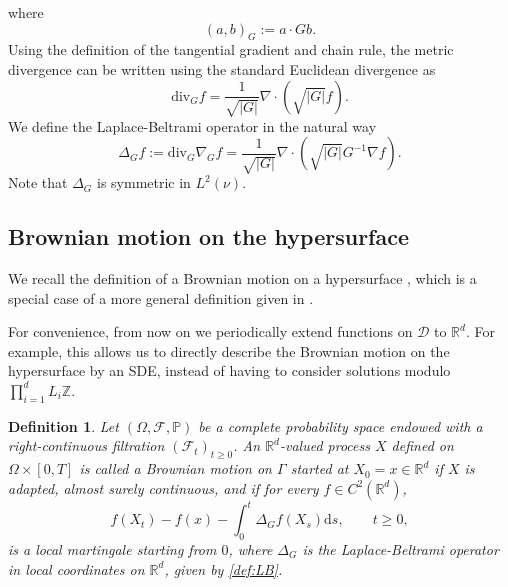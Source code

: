 \documentclass[11pt, a4paper]{article}
\newcommand{\cdummy}{\cdot}
\newcommand{\mathd}{\mathrm{d}}
\newtheorem{definition}[theorem]{Definition}
\begin{document}
where
\[
    (a,b)_G := a \cdot Gb.
\]
Using the definition of the tangential  gradient and chain rule, the metric divergence can be written using the standard Euclidean divergence as
\begin{equation}\label{def:divG}
     \text{div}_G f = \frac{1}{\sqrt{| G |}} \nabla \cdummy \left(
   \sqrt{| G |} f \right) .
   \end{equation}
We define the Laplace-Beltrami operator in the natural way
\begin{equation}\label{def:LB}
    \Delta_G f:= \text{div}_G \nabla_G f= \frac{1}{\sqrt{| G |}} \nabla
   \cdummy \left( \sqrt{| G |} G^{- 1} \nabla f\right).
\end{equation}
Note that $\Delta_G$ is symmetric in $L^2 \left( \nu \right)$.




\subsection{Brownian motion on the hypersurface}


We recall the definition of a Brownian motion on a hypersurface \cite{DuncanElliottPavliotisStuart}, which is a special case of a more general definition given in \cite[Proposition 3.2.1]{Hsu}.




For convenience,  from now on we periodically extend functions on $\mathcal{D}$ to $\mathbb R^d$. For example, this allows us to directly describe the Brownian motion on the hypersurface by an SDE, instead of having to consider  solutions modulo $\prod_{i=1}^d L_i \mathbb Z$.

\begin{definition}
    Let $(\Omega, \mathcal{F},\mathbb{P})$ be a complete probability space endowed with a right-continuous filtration $(\mathcal{F}_t)_{t \geq 0}$. An $\mathbb{R}^d$-valued process $X$ defined on $\Omega \times [0,T]$ is called a Brownian motion on $\Gamma$ started at $X_0=x \in \mathbb{R}^d$ if $X$ is adapted, almost surely continuous, and if for every $f \in C^2(\mathbb R^d)$,
    \[
    f(X_t) - f(x) -\int_0^t \Delta_G f(X_s)\mathd s,\qquad t\ge 0,
    \]
    is a local martingale starting from $0$, where $\Delta_G$ is the Laplace-Beltrami operator in local coordinates on $\mathbb{R}^d$, given by \eqref{def:LB}.
\end{definition}
\end{document}
